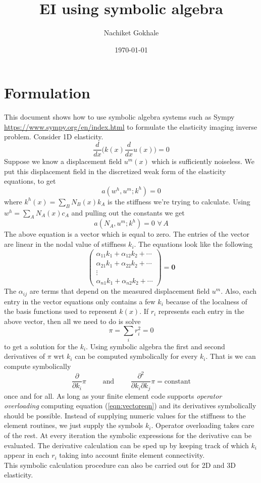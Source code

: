 \documentclass{article}
\newcommand{\beq}{\begin{equation}}
\newcommand{\eeq}{\end{equation}}
\newcommand{\dd}[1]{\frac{d}{d{#1}} }
\newcommand{\pdd}[1]{\frac{\partial}{\partial{#1}}}
\newcommand{\pddd}[2]{\frac{\partial^2}{\partial{#1}\partial{#2}}}
\begin{document}
\title{EI using symbolic algebra}
\author{Nachiket Gokhale}
\date{\today}
\maketitle
\section{Formulation}
This document shows how to use symbolic algebra systems such as Sympy \url{https://www.sympy.org/en/index.html} to formulate the elasticity imaging inverse problem. Consider 1D elasticity.
%
%
\beq
\dd{x}\Big(k(x)\dd{x}u(x)\Big) = 0
\eeq
%
%
Suppose we know a displacement field ${u}^m(x)$ which is sufficiently noiseless. We put this displacement field in the discretized weak form of the elasticity equations,  to get
%
%
\beq
a(w^h,u^m;k^h) = 0
\eeq
where $k^h(x)=\sum_{B}N_B(x)k_A$ is the stiffness we're trying to calculate. Using $w^h=\sum_{A}N_A(x)c_A$ and pulling out the constants we get
%
%
\beq
a(N_A,u^m;k^h) = 0  \,\, \forall \, A
\eeq
%
%
The above equation is a vector which is equal to zero. The entries of the vector are linear in the nodal value of stiffness $k_i$. The equations look like the following
%
%
\beq
\label{eqn:vectoreqn}
\begin{pmatrix}
  \alpha_{11}k_1 + \alpha_{12}k_2 + \cdots \\
  \alpha_{21}k_1 + \alpha_{22}k_2 + \cdots \\
  \vdots\\
  \alpha_{n1}k_1 + \alpha_{n2}k_2 + \cdots
\end{pmatrix}
=\pmb{0}
\eeq
%
%
The $\alpha_{ij}$ are terms that depend on the measured displacement field $u^m$. Also, each entry in the vector equations only contains a few $k_i$ because of the localness of the basis functions used to represent $k(x)$. If $r_i$ represents each entry in the above vector, then all we need to do is solve
%
%
\beq
\pi = \sum_{i}r_i^2 = 0
\eeq
to get a solution for the $k_i$. Using symbolic algebra the first and second derivatives of $\pi$ wrt $k_i$ can be computed symbolically for every $k_i$. That is we can compute symbolically
\beq
\pdd{k_i}\pi \qquad \text{ and } \qquad \pddd{k_i}{k_j}\pi = \text{constant}
\eeq
once and for all. As long as your finite element code supports \textit{operator overloading} computing equation (\ref{eqn:vectoreqn}) and its derivatives symbolically should be possible. Instead of supplying numeric values for the stiffness to the element routines, we just supply the symbols $k_i$. Operator overloading takes care of the rest. At every iteration the symbolic expressions for the derivative can be evaluated. The derivative calculation can be sped up by keeping track of which $k_i$ appear in each $r_i$ taking into account finite element connectivity.\\

This symbolic calculation procedure can also be carried out for 2D and 3D elasticity.
%
%
\end{document}
